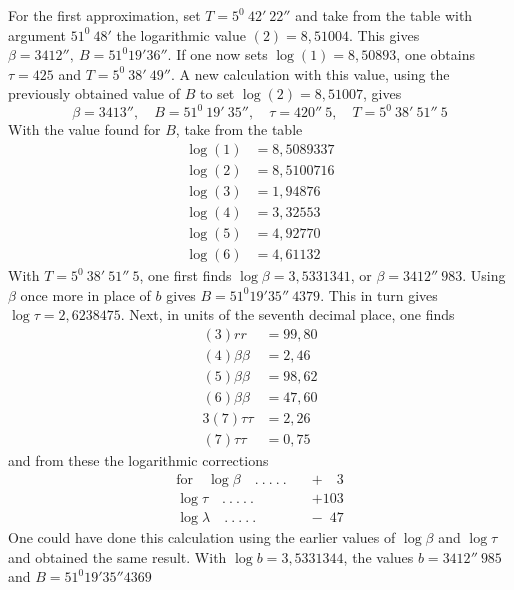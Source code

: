 %
\par\indent For the first approximation, set \(T=5^0\ 42'\ 22''\) and take from the table with argument \(51^0\ 48'\) the logarithmic value \((2)=8{,}51004\). This gives \(\beta=3412'',\ B=51^0 19'36''\). If one now sets \(\log(1)=8{,}50893\), one obtains \(\tau=425\) and \(T=5^0\ 38'\ 49''\). A new calculation with this value, using the previously obtained value of \(B\) to set \(\log(2)=8{,}51007\), gives
\[
\beta=3413'',\quad B=51^0\ 19'\ 35'',\quad\tau=420''\ 5,\quad T=5^0\ 38'\ 51''\ 5
\]
With the value found for \(B\), take from the table
\[
\begin{aligned}
\log(1)&=8{,}5089337\\
\log(2)&=8{,}5100716\\
\log(3)&=1{,}94876\\
\log(4)&=3{,}32553\\
\log(5)&=4{,}92770\\
\log(6)&=4{,}61132
\end{aligned}
\]
With \(T=5^0\ 38'\ 51''\ 5\), one first finds \(\log\beta=3{,}5331341\), or \(\beta=3412''\ 983\). Using \(\beta\) once more in place of \(b\) gives \(B=51^0 19'35''\ 4379\). This in turn gives \(\log\tau=2{,}6238475\). Next, in units of the seventh decimal place, one finds
\[
\begin{aligned}
(3)rr&=99{,}80\\
(4)\beta\beta&=2{,}46\\
(5)\beta\beta&=98{,}62\\
(6)\beta\beta&=47{,}60\\
3(7)\tau\tau&=2{,}26\\
(7)\tau\tau&=0{,}75
\end{aligned}
\]
and from these the logarithmic corrections
\[
\begin{aligned}
\text{for}\quad\log\beta\quad .\ .\ .\ .\ .\quad&+\phantom{10}3\\
\log\tau\quad .\ .\ .\ .\ .\quad&+103\\
\log\lambda\quad .\ .\ .\ .\ .\quad&-\phantom{1}47
\end{aligned}
\]
One could have done this calculation using the earlier values of \(\log\beta\) and \(\log\tau\) and obtained the same result. With \(\log b=3{,}5331344\), the values \(b=3412''\ 985\) and \(B=51^0 19'35''4369\)
